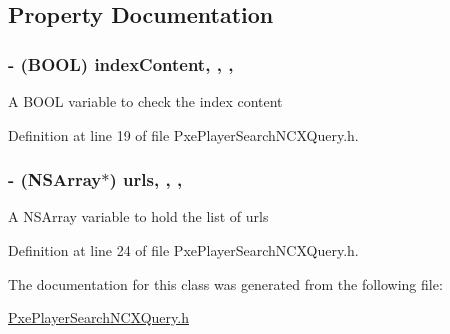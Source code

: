 \subsection{Property Documentation}
\hypertarget{interface_pxe_player_search_n_c_x_query_a23aabff1e2b366881022a16ad7d1e23d}{
\subsubsection[{index\-Content}]{\setlength{\rightskip}{0pt plus 5cm}-\/ (B\-O\-O\-L) index\-Content\hspace{0.3cm}{\ttfamily [read]}, {\ttfamily [write]}, {\ttfamily [nonatomic]}, {\ttfamily [assign]}}}\label{interface_pxe_player_search_n_c_x_query_a23aabff1e2b366881022a16ad7d1e23d}
A B\-O\-O\-L variable to check the index content 

Definition at line 19 of file Pxe\-Player\-Search\-N\-C\-X\-Query.\-h.

\hypertarget{interface_pxe_player_search_n_c_x_query_aac947cec05fc498654dc4e6547920d02}{
\subsubsection[{urls}]{\setlength{\rightskip}{0pt plus 5cm}-\/ (N\-S\-Array$\ast$) urls\hspace{0.3cm}{\ttfamily [read]}, {\ttfamily [write]}, {\ttfamily [nonatomic]}, {\ttfamily [strong]}}}\label{interface_pxe_player_search_n_c_x_query_aac947cec05fc498654dc4e6547920d02}
A N\-S\-Array variable to hold the list of urls 

Definition at line 24 of file Pxe\-Player\-Search\-N\-C\-X\-Query.\-h.



The documentation for this class was generated from the following file\-:\begin{DoxyCompactItemize}
\item 
\hyperlink{_pxe_player_search_n_c_x_query_8h}{Pxe\-Player\-Search\-N\-C\-X\-Query.\-h}\end{DoxyCompactItemize}
